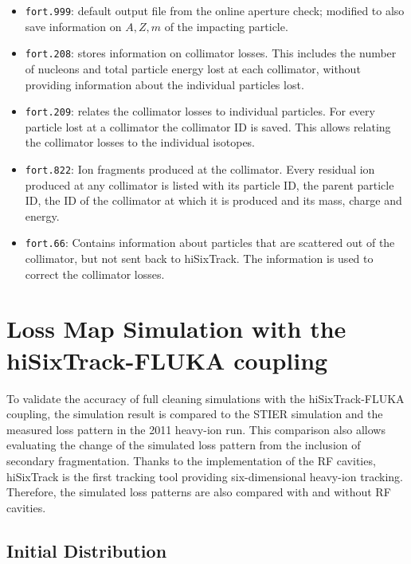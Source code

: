 \begin{itemize}
  \item \texttt{fort.999}: default output file from the online aperture check; modified to also save information on $A,Z,m$ of the impacting particle.
  \item \texttt{fort.208}: stores information on collimator losses. This includes the number of nucleons and total particle energy lost at each collimator, without providing information about the individual particles lost. 
  \item \texttt{fort.209}: relates the collimator losses to individual particles. For every particle lost at a collimator the collimator ID is saved. This allows relating the collimator losses to the individual isotopes.
  \item \texttt{fort.822}: Ion fragments produced at the collimator. Every residual ion produced at any collimator is listed with its particle ID, the parent particle ID, the ID of the collimator at which it is produced and its mass, charge and energy.
  \item \texttt{fort.66}: Contains information about particles that are scattered out of the collimator, but not sent back to hiSixTrack. The information is used to correct the collimator losses.
\end{itemize}

















\section{Loss Map Simulation with the hiSixTrack-FLUKA coupling}

To validate the accuracy of full cleaning simulations with the hiSixTrack-FLUKA coupling, the simulation result is compared to the STIER simulation and the measured loss pattern in the 2011 heavy-ion run. This comparison also allows evaluating the change of the simulated loss pattern from the inclusion of secondary fragmentation. Thanks to the implementation of the RF cavities, hiSixTrack is the first tracking tool providing six-dimensional heavy-ion tracking. Therefore, the simulated loss patterns are also compared with and without RF cavities.


\subsection{Initial Distribution} \label{chap:pha_shift}

